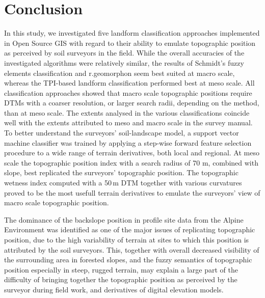 \documentclass[preprint,12pt,authoryear]{elsarticle}
\begin{document}
\section{Conclusion}
In this study, we investigated five landform classification approaches implemented in Open Source GIS with regard to their ability to emulate topographic position as perceived by soil surveyors in the field. While the overall accuracies of the investigated algorithms were relatively similar, the results of Schmidt's fuzzy elements classification and r.geomorphon seem best suited at macro scale, whereas the TPI-based landform classification performed best at meso scale. All classification approaches showed that macro scale topographic positions require DTMs with a coarser resolution, or larger search radii, depending on the method, than at meso scale. The extents analysed in the various classifications coincide well with the extents attributed to meso and macro scale in the survey manual. To better understand the surveyors' soil-landscape model, a support  vector machine classifier was trained by applying a step-wise forward feature selection procedure to a wide range of terrain derivatives, both local and regional. At meso scale the topographic position index with a search radius of 70 m, combined with slope, best replicated the surveyors' topographic position. The topographic wetness index computed with a 50\,m DTM together with various curvatures proved to be the most usefull terrain derivatives to emulate the surveyors' view of macro scale topographic position.
  
The dominance of the backslope position in profile site data from the Alpine Environment was identified as one of the major issues of replicating topographic position, due to the high variability of terrain at sites to which this position is attributed by the soil surveyors. This, together with overall decreased visibility of the surrounding area in forested slopes, and the fuzzy semantics of topographic position especially in steep, rugged terrain, may explain a large part of the difficulty of bringing together the topographic position as perceived by the surveyor during field work, and derivatives of digital elevation models.
\end{document}
